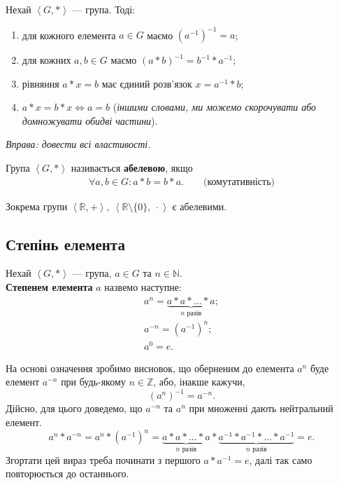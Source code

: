 \documentclass{math_library}
\begin{document}
\begin{proposition}
Нехай $\left<G,* \right>$ --- група. Тоді:
\begin{enumerate}[nosep,wide=0pt, label={\arabic*)}]
\item для кожного елемента $a \in G$ маємо $(a^{-1})^{-1} = a$;
\item для кожних $a,b \in G$ маємо $(a*b)^{-1} = b^{-1}*a^{-1}$;
\item рівняння $a*x = b$ має єдиний розв'язок $x=a^{-1}*b$;
\item $a*x = b*x \iff a = b$ (\textit{іншими словами, ми можемо скорочувати або домножувати обидві частини}).
\end{enumerate}
\textit{Вправа: довести всі властивості.}
\end{proposition}

\begin{definition}
Група $\left<G,* \right>$ називається \textbf{абелевою}, якщо
\begin{align*}
\forall a,b \in G: a*b = b*a. \qquad {\text{(комутативність)}}
\end{align*}
\end{definition}

\begin{example}
Зокрема групи $\left< \mathbb{R},+ \right>,\ \left< \mathbb{R} \setminus \{0\},\ \cdot \right>$ є абелевими.
\end{example}

\subsection{Степінь елемента}
\begin{definition}
Нехай $\left< G, * \right>$ --- група, $a \in G$ та $n \in \mathbb{N}$.\\
\textbf{Степенем елемента} $a$ назвемо наступне:
\begin{align*}
a^n = \underbrace{a*a*\dots*a}_{n \text{ разів}}; \\
a^{-n} = (a^{-1})^{n}; \\
a^0 = e.
\end{align*}
\end{definition}

\begin{remark}
На основі означення зробимо висновок, що оберненим до елемента $a^n$ буде елемент $a^{-n}$ при будь-якому $n \in \mathbb{Z}$, або, інакше кажучи,
\[
(a^n)^{-1} = a^{-n}.
\]
Дійсно, для цього доведемо, що $a^{-n}$ та $a^n$ при множенні дають нейтральний елемент.
\[
a^n * a^{-n} = a^n * (a^{-1})^n = \underbrace{a*a*\dots*a}_{n \text{ разів}} * \underbrace{a^{-1}*a^{-1}*\dots*a^{-1}}_{n \text{ разів}} = e.
\]
Згортати цей вираз треба починати з першого $a*a^{-1} = e$, далі так само повторюється до останнього.
\end{remark}
\end{document}
